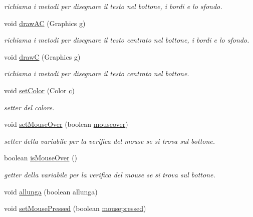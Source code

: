 \begin{DoxyCompactItemize}
\begin{DoxyCompactList}\small\item\em richiama i metodi per disegnare il testo nel bottone, i bordi e lo sfondo. \end{DoxyCompactList}\item 
void \hyperlink{classui_1_1_my_button_aa8318788e7f26fedd7bfbdd0b654ad45}{draw\+AC} (Graphics g)
\begin{DoxyCompactList}\small\item\em richiama i metodi per disegnare il testo centrato nel bottone, i bordi e lo sfondo. \end{DoxyCompactList}\item 
void \hyperlink{classui_1_1_my_button_a56e66f982bfd587482db32cb63e608c4}{drawC} (Graphics g)
\begin{DoxyCompactList}\small\item\em richiama i metodi per disegnare il testo centrato nel bottone. \end{DoxyCompactList}\item 
void \hyperlink{classui_1_1_my_button_acecf901c15a2150148863cbc4d0709da}{set\+Color} (Color \hyperlink{classui_1_1_my_button_a02094092ae89aa4b23bff1976bcbf90d}{c})
\begin{DoxyCompactList}\small\item\em setter del colore. \end{DoxyCompactList}\item 
void \hyperlink{classui_1_1_my_button_ac3f48a7245ffa1fe24d32ea71797997d}{set\+Mouse\+Over} (boolean \hyperlink{classui_1_1_my_button_a6dcc94571aa727e4e184fa31e384a93a}{mouseover})
\begin{DoxyCompactList}\small\item\em setter della variabile per la verifica del mouse se si trova sul bottone. \end{DoxyCompactList}\item 
boolean \hyperlink{classui_1_1_my_button_a2deebd864f1c01a6d81238349c929885}{is\+Mouse\+Over} ()
\begin{DoxyCompactList}\small\item\em getter della variabile per la verifica del mouse se si trova sul bottone. \end{DoxyCompactList}\item 
void \hyperlink{classui_1_1_my_button_a38b44562c6a3dd438f51365e248c7e57}{allunga} (boolean allunga)
\item 
void \hyperlink{classui_1_1_my_button_a773d9d0a3424f8007205c7011f69c723}{set\+Mouse\+Pressed} (boolean \hyperlink{classui_1_1_my_button_a2843f5354ab4fdc301bfc00a460b202f}{mousepressed})

\end{DoxyCompactItemize}
